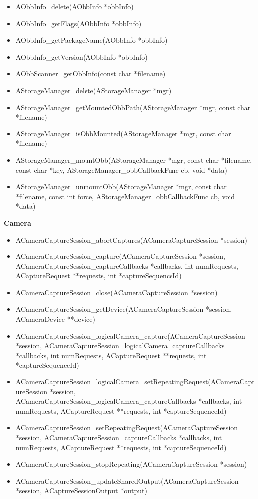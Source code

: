 \documentclass[a4paper, 14pt]{article}
\begin{document}
\begin{itemize}
    \item AObbInfo\_delete(AObbInfo *obbInfo)
    \item AObbInfo\_getFlags(AObbInfo *obbInfo)
    \item AObbInfo\_getPackageName(AObbInfo *obbInfo)
    \item AObbInfo\_getVersion(AObbInfo *obbInfo)
    \item AObbScanner\_getObbInfo(const char *filename)
    \item AStorageManager\_delete(AStorageManager *mgr)
    \item AStorageManager\_getMountedObbPath(AStorageManager *mgr, const char *filename)
    \item AStorageManager\_isObbMounted(AStorageManager *mgr, const char *filename)
    \item AStorageManager\_mountObb(AStorageManager *mgr, const char *filename, const char *key, AStorageManager\_obbCallbackFunc cb, void *data)
    \item AStorageManager\_unmountObb(AStorageManager *mgr, const char *filename, const int force, AStorageManager\_obbCallbackFunc cb, void *data)
\end{itemize}

\textbf{Camera}

\begin{itemize}
    \item ACameraCaptureSession\_abortCaptures(ACameraCaptureSession *session)
    \item ACameraCaptureSession\_capture(ACameraCaptureSession *session, ACameraCaptureSession\_captureCallbacks *callbacks, int numRequests, ACaptureRequest **requests, int *captureSequenceId)
    \item ACameraCaptureSession\_close(ACameraCaptureSession *session)
    \item ACameraCaptureSession\_getDevice(ACameraCaptureSession *session, ACameraDevice **device)
    \item ACameraCaptureSession\_logicalCamera\_capture(ACameraCaptureSession *session, ACameraCaptureSession\_logicalCamera\_captureCallbacks *callbacks, int numRequests, ACaptureRequest **requests, int *captureSequenceId)
    \item ACameraCaptureSession\_logicalCamera\_setRepeatingRequest(ACameraCaptureSession *session, ACameraCaptureSession\_logicalCamera\_captureCallbacks *callbacks, int numRequests, ACaptureRequest **requests, int *captureSequenceId)
    \item ACameraCaptureSession\_setRepeatingRequest(ACameraCaptureSession *session, ACameraCaptureSession\_captureCallbacks *callbacks, int numRequests, ACaptureRequest **requests, int *captureSequenceId)
    \item ACameraCaptureSession\_stopRepeating(ACameraCaptureSession *session)
    \item ACameraCaptureSession\_updateSharedOutput(ACameraCaptureSession *session, ACaptureSessionOutput *output)
\end{itemize}
\end{document}
